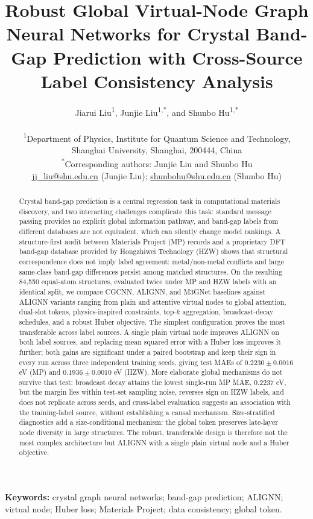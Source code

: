\documentclass[a4paper,11pt]{article}
\title{\bfseries Robust Global Virtual-Node Graph Neural Networks for Crystal Band-Gap Prediction with Cross-Source Label Consistency Analysis}
\author{%
Jiarui Liu\textsuperscript{1}, Junjie Liu\textsuperscript{1,*}, and Shunbo Hu\textsuperscript{1,*}\\[0.8em]
\parbox{\textwidth}{\centering\normalsize
\textsuperscript{1}Department of Physics, Institute for Quantum Science and Technology,\\
Shanghai University, Shanghai, 200444, China\\[0.8em]
\small
\textsuperscript{*}Corresponding authors: Junjie Liu and Shunbo Hu\\
\href{mailto:jj_liu@shu.edu.cn}{jj\_liu@shu.edu.cn} (Junjie Liu); \href{mailto:shunbohu@shu.edu.cn}{shunbohu@shu.edu.cn} (Shunbo Hu)}}
\date{}
\begin{document}
\maketitle

\begin{abstract}
Crystal band-gap prediction is a central regression task in computational materials discovery, and two interacting challenges complicate this task: standard message passing provides no explicit global information pathway, and band-gap labels from different databases are not equivalent, which can silently change model rankings. A structure-first audit between Materials Project (MP) records and a proprietary DFT band-gap database provided by Hongzhiwei Technology (HZW) shows that structural correspondence does not imply label agreement: metal/non-metal conflicts and large same-class band-gap differences persist among matched structures. On the resulting 84,550 equal-atom structures, evaluated twice under MP and HZW labels with an identical split, we compare CGCNN, ALIGNN, and M3GNet baselines against ALIGNN variants ranging from plain and attentive virtual nodes to global attention, dual-slot tokens, physics-inspired constraints, top-\(k\) aggregation, broadcast-decay schedules, and a robust Huber objective. The simplest configuration proves the most transferable across label sources. A single plain virtual node improves ALIGNN on both label sources, and replacing mean squared error with a Huber loss improves it further; both gains are significant under a paired bootstrap and keep their sign in every run across three independent training seeds, giving test MAEs of \(0.2230\pm0.0016\) eV (MP) and \(0.1936\pm0.0010\) eV (HZW). More elaborate global mechanisms do not survive that test: broadcast decay attains the lowest single-run MP MAE, 0.2237 eV, but the margin lies within test-set sampling noise, reverses sign on HZW labels, and does not replicate across seeds, and cross-label evaluation suggests an association with the training-label source, without establishing a causal mechanism. Size-stratified diagnostics add a size-conditional mechanism: the global token preserves late-layer node diversity in large structures. The robust, transferable design is therefore not the most complex architecture but ALIGNN with a single plain virtual node and a Huber objective.
\end{abstract}

\noindent\textbf{Keywords:} crystal graph neural networks; band-gap prediction; ALIGNN; virtual node; Huber loss; Materials Project; data consistency; global token.
\end{document}
